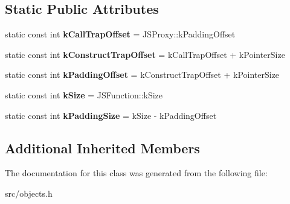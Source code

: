 \subsection*{Static Public Attributes}
\begin{DoxyCompactItemize}
\item 
\hypertarget{classv8_1_1internal_1_1_j_s_function_proxy_ae226debcd352af082df44e03a2453651}{}static const int {\bfseries k\+Call\+Trap\+Offset} = J\+S\+Proxy\+::k\+Padding\+Offset\label{classv8_1_1internal_1_1_j_s_function_proxy_ae226debcd352af082df44e03a2453651}

\item 
\hypertarget{classv8_1_1internal_1_1_j_s_function_proxy_a429bc6652f1ad88c79471d5e8bf87d17}{}static const int {\bfseries k\+Construct\+Trap\+Offset} = k\+Call\+Trap\+Offset + k\+Pointer\+Size\label{classv8_1_1internal_1_1_j_s_function_proxy_a429bc6652f1ad88c79471d5e8bf87d17}

\item 
\hypertarget{classv8_1_1internal_1_1_j_s_function_proxy_ab1b87f12d10c53facfcb134481461667}{}static const int {\bfseries k\+Padding\+Offset} = k\+Construct\+Trap\+Offset + k\+Pointer\+Size\label{classv8_1_1internal_1_1_j_s_function_proxy_ab1b87f12d10c53facfcb134481461667}

\item 
\hypertarget{classv8_1_1internal_1_1_j_s_function_proxy_aa9b0396ecbc530aaced314176cfd6d72}{}static const int {\bfseries k\+Size} = J\+S\+Function\+::k\+Size\label{classv8_1_1internal_1_1_j_s_function_proxy_aa9b0396ecbc530aaced314176cfd6d72}

\item 
\hypertarget{classv8_1_1internal_1_1_j_s_function_proxy_a6568df29335962404ad0e1ec2fa9dc43}{}static const int {\bfseries k\+Padding\+Size} = k\+Size -\/ k\+Padding\+Offset\label{classv8_1_1internal_1_1_j_s_function_proxy_a6568df29335962404ad0e1ec2fa9dc43}

\end{DoxyCompactItemize}
\subsection*{Additional Inherited Members}


The documentation for this class was generated from the following file\+:\begin{DoxyCompactItemize}
\item 
src/objects.\+h\end{DoxyCompactItemize}
